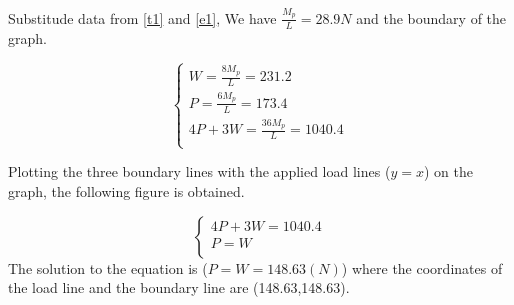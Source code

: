 Substitude data from \autoref{t1} and \autoref{e1}, We have $\frac{M_p}{L}=28.9N$ and the boundary of the graph.

$$
\left\{ \begin{array}{l}
	W=\frac{8M_p}{L}=231.2\\
	P=\frac{6M_p}{L}=173.4\\
	4P+3W=\frac{36M_p}{L}=1040.4\\
\end{array} \right. 
$$

Plotting the three boundary lines with the applied load lines ($y=x$) on the graph, the following figure is obtained.

$$
\left\{ \begin{array}{l}
	4P+3W=1040.4\\
	P=W\\
\end{array} \right. 
$$
The solution to the equation is ($P=W=148.63(N)$)
where the coordinates of the load line and the boundary line are (148.63,148.63\label{ee}).







